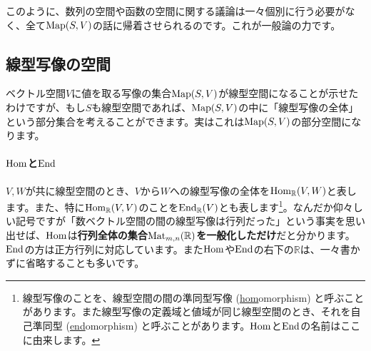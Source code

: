 このように、数列の空間や函数の空間に関する議論は一々個別に行う必要がなく、全て$\operatorname{Map}(S, V)$の話に帰着させられるのです。これが一般論の力です。

\subsection{線型写像の空間} \label{subsection:vector_space_of_linear_map}
ベクトル空間$V$に値を取る写像の集合$\operatorname{Map}(S, V)$が線型空間になることが示せたわけですが、もし$S$も線型空間であれば、$\operatorname{Map}(S, V)$の中に「線型写像の全体」という部分集合を考えることができます。実はこれは$\operatorname{Map}(S, V)$の部分空間になります。

\paragraph{$\operatorname{Hom}$と$\operatorname{End}$}

$V, W$が共に線型空間のとき、$V$から$W$への線型写像の全体を$\operatorname{Hom}_{\mathbb{R}}(V, W)$と表します。また、特に$\operatorname{Hom}_{\mathbb{R}}(V, V)$のことを$\operatorname{End}_{\mathbb{R}}(V)$とも表します\footnote{線型写像のことを、線型空間の間の準同型写像 (\underline{hom}omorphism) と呼ぶことがあります。また線型写像の定義域と値域が同じ線型空間のとき、それを自己準同型 (\underline{end}omorphism) と呼ぶことがあります。$\operatorname{Hom}$と$\operatorname{End}$の名前はここに由来します。}。なんだか仰々しい記号ですが「数ベクトル空間の間の線型写像は行列だった」という事実を思い出せば、$\operatorname{Hom}$は\textbf{行列全体の集合$\operatorname{Mat}_{m,n}(\mathbb{R})$を一般化しただけ}だと分かります。$\operatorname{End}$の方は正方行列に対応しています。また$\operatorname{Hom}$や$\operatorname{End}$の右下の$\mathbb{R}$は、一々書かずに省略することも多いです。

